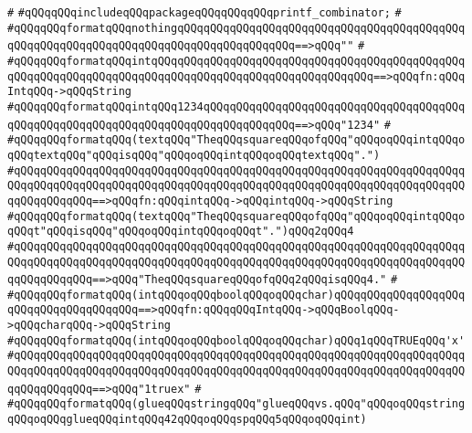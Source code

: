 \verb|#|\newline
\verb|#qQQqqQQqincludeqQQqpackageqQQqqQQqqQQqprintf_combinator;|\newline
\verb|#|\newline
\verb|#qQQqqQQqformatqQQqnothingqQQqqQQqqQQqqQQqqQQqqQQqqQQqqQQqqQQqqQQqqQQqqQQqqQQqqQQqqQQqqQQqqQQqqQQqqQQqqQQqqQQqqQQq==>qQQq""|\newline
\verb|#|\newline
\verb|#qQQqqQQqformatqQQqintqQQqqQQqqQQqqQQqqQQqqQQqqQQqqQQqqQQqqQQqqQQqqQQqqQQqqQQqqQQqqQQqqQQqqQQqqQQqqQQqqQQqqQQqqQQqqQQqqQQqqQQq==>qQQqfn:qQQqIntqQQq->qQQqString|\newline
\verb|#qQQqqQQqformatqQQqintqQQq1234qQQqqQQqqQQqqQQqqQQqqQQqqQQqqQQqqQQqqQQqqQQqqQQqqQQqqQQqqQQqqQQqqQQqqQQqqQQqqQQqqQQq==>qQQq"1234"|\newline
\verb|#|\newline
\verb|#qQQqqQQqformatqQQq(textqQQq"TheqQQqsquareqQQqofqQQq"qQQqoqQQqintqQQqoqQQqtextqQQq"qQQqisqQQq"qQQqoqQQqintqQQqoqQQqtextqQQq".")|\newline
\verb|#qQQqqQQqqQQqqQQqqQQqqQQqqQQqqQQqqQQqqQQqqQQqqQQqqQQqqQQqqQQqqQQqqQQqqQQqqQQqqQQqqQQqqQQqqQQqqQQqqQQqqQQqqQQqqQQqqQQqqQQqqQQqqQQqqQQqqQQqqQQqqQQqqQQqqQQq==>qQQqfn:qQQqintqQQq->qQQqintqQQq->qQQqString|\newline
\verb|#qQQqqQQqformatqQQq(textqQQq"TheqQQqsquareqQQqofqQQq"qQQqoqQQqintqQQqoqQQqt"qQQqisqQQq"qQQqoqQQqintqQQqoqQQqt".")qQQq2qQQq4|\newline
\verb|#qQQqqQQqqQQqqQQqqQQqqQQqqQQqqQQqqQQqqQQqqQQqqQQqqQQqqQQqqQQqqQQqqQQqqQQqqQQqqQQqqQQqqQQqqQQqqQQqqQQqqQQqqQQqqQQqqQQqqQQqqQQqqQQqqQQqqQQqqQQqqQQqqQQqqQQq==>qQQq"TheqQQqsquareqQQqofqQQq2qQQqisqQQq4."|\newline
\verb|#|\newline
\verb|#qQQqqQQqformatqQQq(intqQQqoqQQqboolqQQqoqQQqchar)qQQqqQQqqQQqqQQqqQQqqQQqqQQqqQQqqQQqqQQq==>qQQqfn:qQQqqQQqIntqQQq->qQQqBoolqQQq->qQQqcharqQQq->qQQqString|\newline
\verb|#qQQqqQQqformatqQQq(intqQQqoqQQqboolqQQqoqQQqchar)qQQq1qQQqTRUEqQQq'x'|\newline
\verb|#qQQqqQQqqQQqqQQqqQQqqQQqqQQqqQQqqQQqqQQqqQQqqQQqqQQqqQQqqQQqqQQqqQQqqQQqqQQqqQQqqQQqqQQqqQQqqQQqqQQqqQQqqQQqqQQqqQQqqQQqqQQqqQQqqQQqqQQqqQQqqQQqqQQqqQQq==>qQQq"1truex"|\newline
\verb|#|\newline
\verb|#qQQqqQQqformatqQQq(glueqQQqstringqQQq"glueqQQqvs.qQQq"qQQqoqQQqstringqQQqoqQQqglueqQQqintqQQq42qQQqoqQQqspqQQq5qQQqoqQQqint)|\newline
